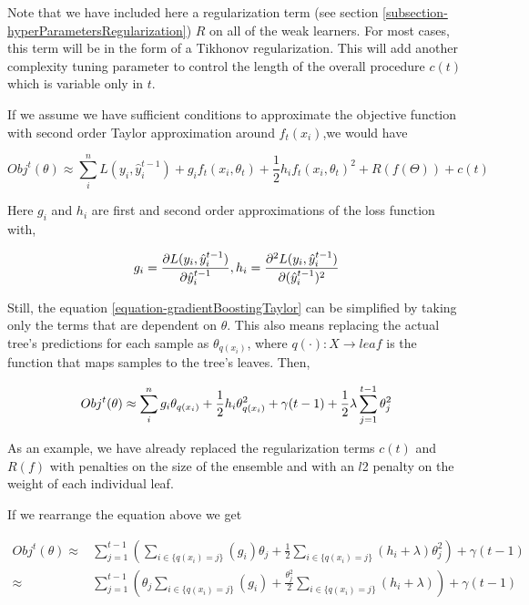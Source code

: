 Note that we have included here a regularization term (see section \ref{subsection-hyperParametersRegularization}) $R$ on all of the weak learners. For most cases,  this term will be in the form of a Tikhonov regularization. This will add another complexity tuning parameter to control the length of the overall procedure $c(t)$ which is variable only in $t$.

If we assume we have sufficient conditions to approximate the objective function with second order Taylor approximation around $f_t(x_i)$,we would have

\begin{equation}\label{equation-gradientBoostingTaylor}
Obj^t(\theta) \approx \sum_i^n {L(y_i, \hat{y}^{t-1}_i) + g_i f_t(x_i,\theta_t) + \frac{1}{2} h_i f_t(x_i,\theta_t)^2 } +  R(f(\Theta)) +  c(t)
\end{equation}

Here $g_i$ and $h_i$ are first and second order approximations of the loss function with,

\begin{equation}
g_i =  \frac{\partial L(y_i, \hat{y}^{t-1}_i)}{\partial \hat{y}^{t-1}_i}, \  \\
h_i =  \frac{\partial^2 L(y_i, \hat{y}^{t-1}_i)}{\partial (\hat{y}^{t-1}_i)^2 }
\end{equation}

Still, the equation \ref{equation-gradientBoostingTaylor} can be simplified by taking only the terms that are dependent on $\theta$. This also means replacing the actual tree's predictions for each sample as $\theta_{q(x_i)}$, where $q(\cdot): X \rightarrow leaf$ is the function that maps samples to the tree's leaves. Then,


\begin{equation} \label{eq:gb-objSteps1}
Obj^t(\theta) \approx  \sum_i^n {g_i \theta_{q(x_i)} + \frac{1}{2} h_i \theta_{q(x_i)}^2 } + \gamma ({t-1}) + \frac{1}{2}\lambda \sum_{j=1}^{t-1} \theta_j^2 \\
\end{equation}

As an example, we have already replaced the regularization terms $c(t)$ and $R(f)$ with penalties on the size of the ensemble and with an $l$2 penalty on the weight of each individual leaf.

If we rearrange the equation above we get

\begin{equation} \label{eq:gb-objSteps1}
\begin{split}
Obj^t(\theta) \approx  & \sum_{j=1}^{t-1} \left(  \sum_{i \in \{q(x_i)=j\}} (g_i )\theta_{j} + \frac{1}{2} \sum_{i \in \{q(x_i)=j\}} (h_i + \lambda ) \theta_{j}^2  \right) + \gamma ({t-1}) \\
\approx  & \sum_{j=1}^{t-1} \left(  \theta_{j}\sum_{i \in \{q(x_i)=j\}} (g_i ) + \frac{\theta_{j}^2}{2} \sum_{i \in \{q(x_i)=j\}} (h_i + \lambda )  \right) + \gamma ({t-1})
\end{split}
\end{equation}


